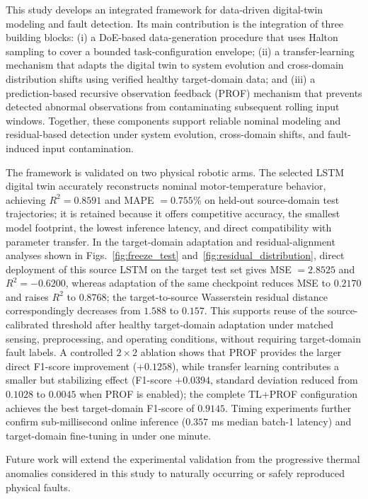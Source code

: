 \documentclass[a4paper,10pt]{cas-sc}%
\newcommand{\roundtworev}[1]{\textcolor{roundtwored}{#1}}
\newenvironment{revision}{}{}
\begin{document}
\begin{revision}
	This study develops an integrated framework for data-driven digital-twin modeling and fault detection. Its main contribution is the integration of three building blocks: (i) a DoE-based data-generation procedure that uses Halton sampling to cover a bounded task-configuration envelope; (ii) a transfer-learning mechanism that adapts the digital twin to system evolution and cross-domain distribution shifts using verified healthy target-domain data; and (iii) a prediction-based recursive observation feedback (PROF) mechanism that prevents detected abnormal observations from contaminating subsequent rolling input windows. Together, these components support reliable nominal modeling and residual-based detection under system evolution, cross-domain shifts, and fault-induced input contamination.

	The framework is validated on two physical robotic arms. The selected LSTM digital twin accurately reconstructs nominal motor-temperature behavior, achieving $R^2=0.8591$ and MAPE $=0.755\%$ on held-out source-domain test trajectories; it is retained because it offers competitive accuracy, the smallest model footprint, the lowest inference latency, and direct compatibility with parameter transfer. \roundtworev{In the target-domain adaptation and residual-alignment analyses shown in Figs.~\ref{fig:freeze_test} and~\ref{fig:residual_distribution},} direct deployment of this source LSTM on the target test set gives MSE $=2.8525$ and $R^2=-0.6200$, whereas adaptation of the same checkpoint reduces MSE to $0.2170$ and raises $R^2$ to $0.8768$; the target-to-source Wasserstein residual distance correspondingly decreases from $1.588$ to $0.157$. This supports reuse of the source-calibrated threshold after healthy target-domain adaptation under matched sensing, preprocessing, and operating conditions, without requiring target-domain fault labels. A controlled $2\times2$ ablation shows that PROF provides the larger direct F1-score improvement ($+0.1258$), while transfer learning contributes a smaller but stabilizing effect (F1-score $+0.0394$, standard deviation reduced from $0.1028$ to $0.0045$ when PROF is enabled); the complete TL+PROF configuration achieves the best target-domain F1-score of $0.9145$. Timing experiments further confirm sub-millisecond online inference ($0.357$ ms median batch-1 latency) and target-domain fine-tuning in under one minute.

	Future work will extend the experimental validation from the progressive thermal anomalies considered in this study to naturally occurring or safely reproduced physical faults.
\end{revision}
\end{document}
